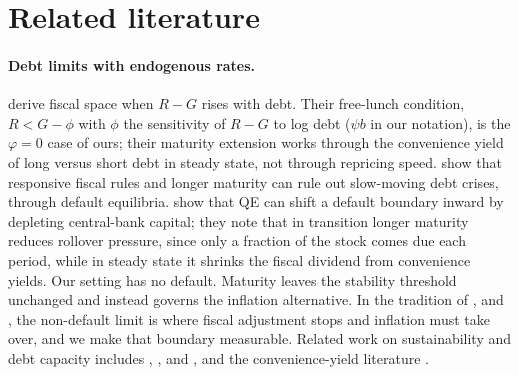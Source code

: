 \section{Related literature}\label{sec:literature}

\paragraph{Debt limits with endogenous rates.} \citet{mian2025} derive fiscal space when $R-G$ rises with debt. Their free-lunch condition, $R<G-\phi$ with $\phi$ the sensitivity of $R-G$ to log debt ($\psi b$ in our notation), is the $\varphi=0$ case of ours; their maturity extension works through the convenience yield of long versus short debt in steady state, not through repricing speed. \citet{lorenzoni2019} show that responsive fiscal rules and longer maturity can rule out slow-moving debt crises, through default equilibria. \citet{li2026} show that QE can shift a default boundary inward by depleting central-bank capital; they note that in transition longer maturity reduces rollover pressure, since only a fraction of the stock comes due each period, while in steady state it shrinks the fiscal dividend from convenience yields. Our setting has no default. Maturity leaves the stability threshold unchanged and instead governs the inflation alternative. In the tradition of \citet{sargent1981}, \citet{davig2011} and \citet{leeper2011}, the non-default limit is where fiscal adjustment stops and inflation must take over, and we make that boundary measurable. Related work on sustainability and debt capacity includes \citet{blanchard2019}, \citet{mehrotra2021}, \citet{reis2021} and \citet{ghosh2013}, and the convenience-yield literature \citep{krishnamurthy2012,choi2026,jiang2024}.

